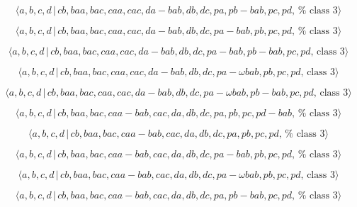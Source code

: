 \documentclass[10pt]{article}
\begin{document}
\begin{equation}
\langle a,b,c,d\,|\,cb,baa,bac,caa,cac,da-bab,db,dc,pa,pb-bab,pc,pd,\,\text{%
class }3\rangle  \tag{7.3757}
\end{equation}

\begin{equation}
\langle a,b,c,d\,|\,cb,baa,bac,caa,cac,da-bab,db,dc,pa-bab,pb,pc,pd,\,\text{%
class }3\rangle  \tag{7.3758}
\end{equation}

\begin{equation}
\langle a,b,c,d\,|\,cb,baa,bac,caa,cac,da-bab,db,dc,pa-bab,pb-bab,pc,pd,\,%
\text{class }3\rangle  \tag{7.3759}
\end{equation}

\begin{equation}
\langle a,b,c,d\,|\,cb,baa,bac,caa,cac,da-bab,db,dc,pa-\omega bab,pb,pc,pd,\,%
\text{class }3\rangle  \tag{7.3760}
\end{equation}

\begin{equation}
\langle a,b,c,d\,|\,cb,baa,bac,caa,cac,da-bab,db,dc,pa-\omega
bab,pb-bab,pc,pd,\,\text{class }3\rangle  \tag{7.3761}
\end{equation}

\begin{equation}
\langle a,b,c,d\,|\,cb,baa,bac,caa-bab,cac,da,db,dc,pa,pb,pc,pd-bab,\,\text{%
class }3\rangle  \tag{7.3762}
\end{equation}

\begin{equation}
\langle a,b,c,d\,|\,cb,baa,bac,caa-bab,cac,da,db,dc,pa,pb,pc,pd,\,\text{%
class }3\rangle  \tag{7.3763}
\end{equation}

\begin{equation}
\langle a,b,c,d\,|\,cb,baa,bac,caa-bab,cac,da,db,dc,pa-bab,pb,pc,pd,\,\text{%
class }3\rangle  \tag{7.3764}
\end{equation}

\begin{equation}
\langle a,b,c,d\,|\,cb,baa,bac,caa-bab,cac,da,db,dc,pa-\omega bab,pb,pc,pd,\,%
\text{class }3\rangle  \tag{7.3765}
\end{equation}

\begin{equation}
\langle a,b,c,d\,|\,cb,baa,bac,caa-bab,cac,da,db,dc,pa,pb-bab,pc,pd,\,\text{%
class }3\rangle  \tag{7.3766}
\end{equation}
\end{document}

